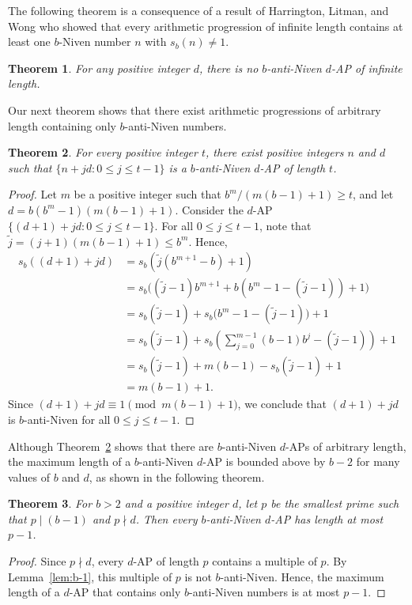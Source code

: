 \documentclass[12pt]{article}
\newtheorem{theorem}{Theorem}[section]
\theoremstyle{definition}
\begin{document}
The following theorem is a consequence of a result of Harrington, Litman, and Wong \cite{hlw} who showed that every arithmetic progression of infinite length contains at least one $b$-Niven number $n$ with $s_b(n)\neq 1$.
\begin{theorem}
For any positive integer $d$, there is no $b$-anti-Niven $d$-AP of infinite length.
\end{theorem}

Our next theorem shows that there exist arithmetic progressions of arbitrary length containing only $b$-anti-Niven numbers.

\begin{theorem}\label{thm:arbitrary}
For every positive integer $t$, there exist positive integers $n$ and $d$ such that $\{n+jd:0\leq j\leq t-1\}$ is a $b$-anti-Niven $d$-AP of length $t$.
\end{theorem}
\begin{proof}
Let $m$ be a positive integer such that $b^m/(m(b-1)+1)\geq t$, and let $d=b(b^m-1)(m(b-1)+1)$. Consider the $d$-AP $\{(d+1)+jd:0\leq j\leq t-1\}$. For all $0\leq j\leq t-1$, note that $\widetilde{j}=(j+1)(m(b-1)+1)\leq b^m$. Hence,
\begin{align*}
s_b((d+1)+jd)&=s_b(\widetilde{j}(b^{m+1}-b)+1)\\
&=s_b\big((\widetilde{j}-1)b^{m+1}+b(b^m-1-(\widetilde{j}-1))+1\big)\\
&=s_b(\widetilde{j}-1)+s_b\big(b^m-1-(\widetilde{j}-1)\big)+1\\
&=s_b(\widetilde{j}-1)+s_b\left(\sum_{j=0}^{m-1}(b-1)b^j-(\widetilde{j}-1)\right)+1\\
&=s_b(\widetilde{j}-1)+m(b-1)-s_b(\widetilde{j}-1)+1\\
&=m(b-1)+1.
\end{align*}
Since $(d+1)+jd\equiv1\pmod{m(b-1)+1}$, we conclude that $(d+1)+jd$ is $b$-anti-Niven for all $0\leq j\leq t-1$.
\end{proof}

Although Theorem~\ref{thm:arbitrary} shows that there are $b$-anti-Niven $d$-APs of arbitrary length, the maximum length of a $b$-anti-Niven $d$-AP is bounded above by $b-2$ for many values of $b$ and $d$, as shown in the following theorem.

\begin{theorem}\label{thm:bound}
For $b>2$ and a positive integer $d$, let $p$ be the smallest prime such that $p\mid(b-1)$ and $p\nmid d$.  Then every $b$-anti-Niven $d$-AP has length at most $p-1$.
\end{theorem}
\begin{proof}
Since $p\nmid d$, every $d$-AP of length $p$ contains a multiple of $p$. By Lemma~\ref{lem:b-1}, this multiple of $p$ is not $b$-anti-Niven. Hence, the maximum length of a $d$-AP that contains only $b$-anti-Niven numbers is at most $p-1$.
\end{proof}
\end{document}
